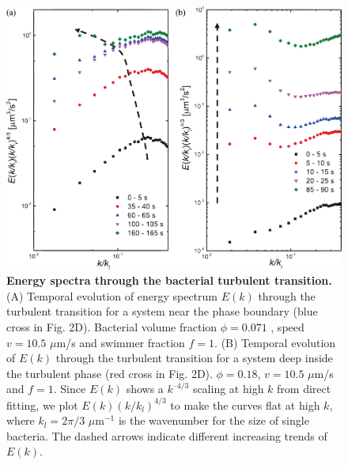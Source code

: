 \begin{figure}[!ht]
	\begin{center}
	\includegraphics[width=5.5 in]{Figs/4-Emergence/5.pdf}
	\end{center}
	\caption[Energy spectra through the bacterial turbulent transition]
	{
	\textbf{Energy spectra through the bacterial turbulent transition.}
   (A) Temporal evolution of energy spectrum $E(k)$ through the turbulent transition for a system near the phase boundary (blue cross in Fig. 2D). Bacterial volume fraction $\phi= 0.071$ , speed $v = 10.5$ $\mu$m/s and swimmer fraction $f = 1$.
   (B) Temporal evolution of $E(k)$ through the turbulent transition for a system deep inside the turbulent phase (red cross in Fig. 2D). $\phi = 0.18$, $v = 10.5$ $\mu$m/s and $f = 1$. Since $E(k)$ shows a $k^{–4/3}$ scaling at high $k$ from direct fitting, we plot $E(k)(k/k_l)^{4/3}$ to make the curves flat at high $k$, where $k_l = 2\pi/3$ $\mu$m$^{-1}$ is the wavenumber for the size of single bacteria. The dashed arrows indicate different increasing trends of $E(k)$.
	}
	\label{fig:4-spectra}
\end{figure}

